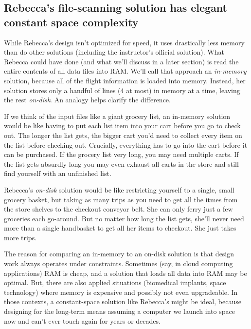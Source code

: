 \subsection{Rebecca's file-scanning solution has elegant constant space complexity}\label{rebeccas-file-scanning-solution-has-elegant-constant-space-complexity}

While Rebecca's design isn't optimized for speed, it uses drastically less memory than do other solutions (including the instructor's official solution). What Rebecca could have done (and what we'll discuss in a later section) is read the entire contents of all data files into RAM. We'll call that approach an \emph{in-memory} solution, because all of the flight information is loaded into memory. Instead, her solution stores only a handful of lines (4 at most) in memory at a time, leaving the rest \emph{on-disk}. An analogy helps clarify the difference.

If we think of the input files like a giant grocery list, an in-memory solution would be like having to put each list item into your cart before you go to check out. The longer the list gets, the bigger cart you'd need to collect every item on the list before checking out. Crucially, everything has to go into the cart before it can be purchased. If the grocery list very long, you may need multiple carts. If the list gets absurdly long you may even exhaust all carts in the store and still find yourself with an unfinished list.

Rebecca's \emph{on-disk} solution would be like restricting yourself to a single, small grocery basket, but taking as many trips as you need to get all the itmes from the store shelves to the checkout conveyor belt. She can only ferry just a few groceries each go-around. But no matter how long the list gets, she'll never need more than a single handbasket to get all her items to checkout. She just takes more trips.

The reason for comparing an in-memory to an on-disk solution is that design work always operates under constraints. Sometimes (say, in cloud computing applications) RAM is cheap, and a solution that loads all data into RAM may be optimal. But, there are also applied situations (biomedical implants, space technology) where memory is expensive and possibly not even upgradeable. In those contexts, a constant-space solution like Rebecca's might be ideal, because designing for the long-term means assuming a computer we launch into space now and can't ever touch again for years or decades.

